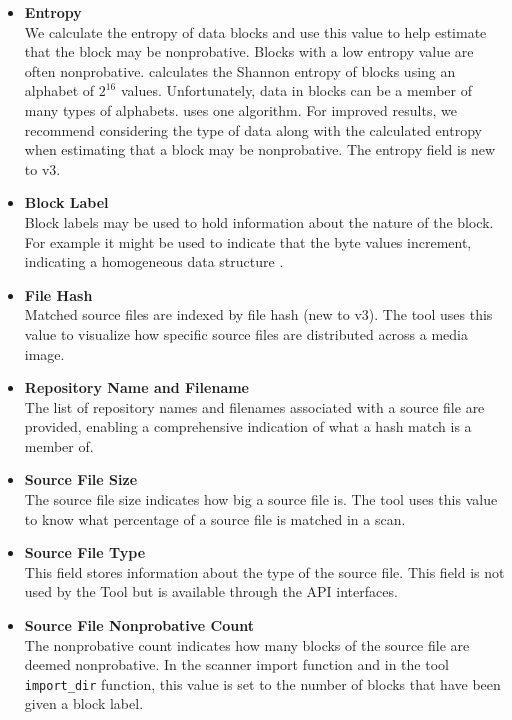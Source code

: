 \documentclass[11pt,fleqn]{article} %
\begin{document}
\begin{itemize}
\item \textbf{Entropy}\\
We calculate the entropy of data blocks and use this value to help estimate that the block may be nonprobative. Blocks with a low entropy value are often nonprobative. \hdb calculates the Shannon entropy of blocks using an alphabet of $2^{16}$ values. Unfortunately, data in blocks can be a member of many types of alphabets. \hdb uses one algorithm.  For improved results, we recommend considering the type of data along with the calculated entropy when estimating that a block may be nonprobative. The entropy field is new to \hdb v3.\\
\item \textbf{Block Label}\\
Block labels may be used to hold information about the nature of the block.  For example it might be used to indicate that the byte values increment, indicating a homogeneous data structure \cite{hashBasedCarving}.\\
\item \textbf{File Hash}\\
Matched source files are indexed by file hash (new to \hdb v3). The \sscope tool uses this value to visualize how specific source files are distributed across a media image.\\
\item \textbf{Repository Name and Filename}\\
The list of repository names and filenames associated with a source file are provided, enabling a comprehensive indication of what a hash match is a member of.\\
\item \textbf{Source File Size}\\
The source file size indicates how big a source file is. The \sscope tool uses this value to know what percentage of a source file is matched in a scan.\\
\item \textbf{Source File Type}\\
This field stores information about the type of the source file. This field is not used by the \hdb Tool but is available through the \hdb API interfaces.\\
\item \textbf{Source File Nonprobative Count}\\
The nonprobative count indicates how many blocks of the source file are deemed nonprobative. In the \bulk \hdb scanner import function and in the \hdb tool \verb+import_dir+ function, this value is set to the number of blocks that have been given a block label.\\
\end{itemize}
\end{document}
